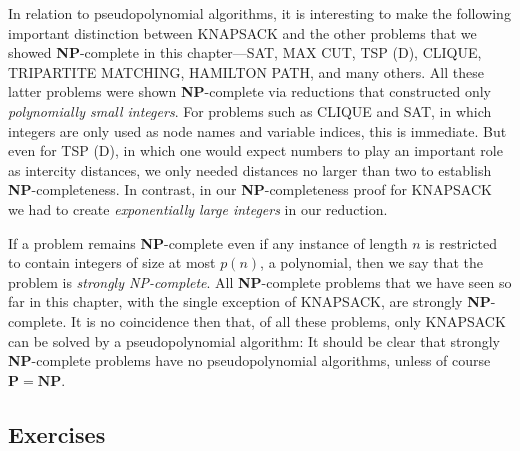 \documentclass[12pt]{article}
\begin{document}
In relation to pseudopolynomial algorithms, it is interesting to make the following important distinction between \textsc{KNAPSACK} and the other problems that we showed \textbf{NP}-complete in this chapter---\textsc{SAT}, \textsc{MAX CUT}, \textsc{TSP (D)}, \textsc{CLIQUE}, \textsc{TRIPARTITE MATCHING}, \textsc{HAMILTON PATH}, and many others. All these latter problems were shown \textbf{NP}-complete via reductions that constructed only \textit{polynomially small integers}. For problems such as \textsc{CLIQUE} and \textsc{SAT}, in which integers are only used as node names and variable indices, this is immediate. But even for \textsc{TSP (D)}, in which one would expect numbers to play an important role as intercity distances, we only needed distances no larger than two to establish \textbf{NP}-completeness. In contrast, in our \textbf{NP}-completeness proof for \textsc{KNAPSACK} we had to create \textit{exponentially large integers} in our reduction.
\begin{defbox}
If a problem remains \textbf{NP}-complete even if any instance of length $n$ is restricted to contain integers of size at most $p(n)$, a polynomial, then we say that the problem is \textit{strongly NP-complete}. All \textbf{NP}-complete problems that we have seen so far in this chapter, with the single exception of \textsc{KNAPSACK}, are strongly \textbf{NP}-complete. It is no coincidence then that, of all these problems, only \textsc{KNAPSACK} can be solved by a pseudopolynomial algorithm: It should be clear that strongly \textbf{NP}-complete problems have no pseudopolynomial algorithms, unless of course $\mathbf{P} = \mathbf{NP}$.
\end{defbox}
\subsection{Exercises}
\end{document}
